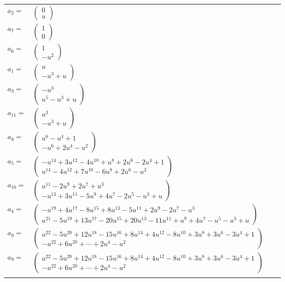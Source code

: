 \documentclass[1p]{elsarticle_modified}
\theoremstyle{definition}
\begin{document}
\begin{tabular}{m{7pt} m{180pt} m{7pt} m{180pt} }
\flushright $a_{2}=$&$\begin{pmatrix}0\\u\end{pmatrix}$ \\
\flushright $a_{7}=$&$\begin{pmatrix}1\\0\end{pmatrix}$ \\
\flushright $a_{6}=$&$\begin{pmatrix}1\\- u^2\end{pmatrix}$ \\
\flushright $a_{1}=$&$\begin{pmatrix}u\\- u^3+u\end{pmatrix}$ \\
\flushright $a_{3}=$&$\begin{pmatrix}- u^3\\u^5- u^3+u\end{pmatrix}$ \\
\flushright $a_{11}=$&$\begin{pmatrix}u^3\\- u^3+u\end{pmatrix}$ \\
\flushright $a_{8}=$&$\begin{pmatrix}u^6- u^4+1\\- u^6+2 u^4- u^2\end{pmatrix}$ \\
\flushright $a_{5}=$&$\begin{pmatrix}- u^{14}+3 u^{12}-4 u^{10}+u^8+2 u^6-2 u^4+1\\u^{14}-4 u^{12}+7 u^{10}-6 u^8+2 u^6- u^2\end{pmatrix}$ \\
\flushright $a_{10}=$&$\begin{pmatrix}u^{11}-2 u^9+2 u^7+u^3\\- u^{13}+3 u^{11}-5 u^9+4 u^7-2 u^5- u^3+u\end{pmatrix}$ \\
\flushright $a_{4}=$&$\begin{pmatrix}- u^{19}+4 u^{17}-8 u^{15}+8 u^{13}-5 u^{11}+2 u^9-2 u^7- u^3\\u^{21}-5 u^{19}+13 u^{17}-20 u^{15}+20 u^{13}-11 u^{11}+u^9+4 u^7- u^5- u^3+u\end{pmatrix}$ \\
\flushright $a_{9}=$&$\begin{pmatrix}u^{22}-5 u^{20}+12 u^{18}-15 u^{16}+8 u^{14}+4 u^{12}-8 u^{10}+3 u^8+3 u^6-3 u^4+1\\- u^{22}+6 u^{20}+\cdots+2 u^4- u^2\end{pmatrix}$\\ \flushright $a_{9}=$&$\begin{pmatrix}u^{22}-5 u^{20}+12 u^{18}-15 u^{16}+8 u^{14}+4 u^{12}-8 u^{10}+3 u^8+3 u^6-3 u^4+1\\- u^{22}+6 u^{20}+\cdots+2 u^4- u^2\end{pmatrix}$\\&\end{tabular}
\end{document}
